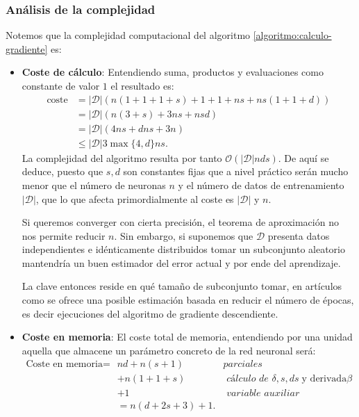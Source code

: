 \subsubsection*{Análisis de la complejidad}  
\label{ch05:complejidad-gradientes}
Notemos que la complejidad computacional del algoritmo  \ref{algoritmo:calculo-gradiente} es:
\begin{itemize}
    \item \textbf{Coste de cálculo}:  Entendiendo suma, productos y evaluaciones como constante de valor $1$ el resultado es: 
    \begin{align}
        \text{coste} &=
        |\mathcal{D}| 
        \left(
            n(1+1+1 + s) + 
            1+1 +
            n s 
            + n s (1 + 1 + d) 
        \right) 
        \\
        & =   
        |\mathcal{D}| 
        ( 
            n (3 + s)  
            +  3 n s
            + n s d
        ) 
        \\
        & = |\mathcal{D}|
        (
            4 n s + d n s + 3 n
        )  
        \\
        & \leq 
        |\mathcal{D}|
        3 \max \{4, d \} n s.
    \end{align} 
    La complejidad del algoritmo resulta por tanto 
    $\mathcal{O}(|\mathcal{D}| n d s)$.
    De aquí se deduce, puesto que $s,d$ son constantes fijas que a nivel práctico serán 
    mucho menor que el número de neuronas  $n$ y el 
    número de datos de entrenamiento $|\mathcal{D}| $,
     que lo que afecta primordialmente al coste es 
     $|\mathcal{D}| $ y $n$. 
    
    Si queremos converger con cierta precisión, el teorema de aproximación no nos permite reducir $n$. Sin embargo, si suponemos que $\mathcal{D}$
    presenta datos independientes e idénticamente distribuidos tomar un subconjunto aleatorio mantendría un buen estimador del error actual y por ende del aprendizaje. 

    La clave entonces reside en qué tamaño de subconjunto tomar, en artículos como \cite{mini-batch-size} se ofrece una posible estimación basada en reducir el número de épocas, es decir ejecuciones del algoritmo de gradiente descendiente. 


    \item \textbf{Coste en memoria}: 
    El coste total de memoria, entendiendo por una unidad aquella que almacene un parámetro concreto de la red neuronal será: 
    \begin{align}
        \text{Coste en memoria} = &
         n d + n (s + 1) \; &  \textit{parciales}
         \\& + n (1 + 1 + s)  \; & \textit{ cálculo de }
          \delta, s, d s \; \text{y derivada}\beta
         \\& +1 \; &  \textit{ variable auxiliar}
         \\& = n (d + 2s +3) +1.
    \end{align}
\end{itemize} 



